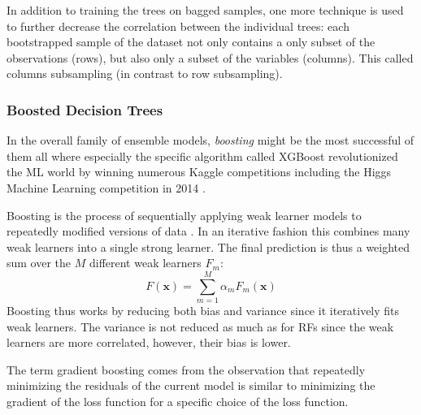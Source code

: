 \documentclass[a4paper, twoside, nobib]{tufte-book}
\newcommand{\autocite}[1]{\citep{#1}}
\renewcommand{\vec}[1]{\mathbf{#1}}
\newcommand{\TODO}{\textcolor{red}{\bf TODO!}\xspace}
\begin{document}
In addition to training the trees on bagged samples, one more technique is used to further decrease the correlation between the individual trees: each bootstrapped sample of the dataset not only contains a only subset of the observations (rows), but also only a subset of the variables (columns). This called columns subsampling (in contrast to row subsampling).


\subsubsection{Boosted Decision Trees}
\label{subsubsec:ml:boosted_decision_trees}
In the overall family of ensemble models, \emph{boosting} might be the most successful of them all where especially the specific algorithm called XGBoost \autocite{chenXGBoostScalableTree2016} revolutionized the ML world by winning numerous Kaggle\sidenote{XXX \TODO} competitions \autocite{DmlcXgboost} including the Higgs Machine Learning competition in \num{2014} \autocite{HEPMeetsML}. 

Boosting is the process of sequentially applying weak learner models to repeatedly modified versions of data \autocite{hastieElementsStatisticalLearning2009}. In an iterative fashion this combines many weak learners into a single strong learner. The final prediction is thus a weighted sum over the $M$ different weak learners $F_m$: 
\begin{equation}
  F(\vec{x}) = \sum_{m=1}^M \alpha_m F_m(\vec{x})
\end{equation}
Boosting thus works by reducing both bias and variance since it iteratively fits weak learners. The variance is not reduced as much as for RFs since the weak learners are more correlated, however, their bias is lower. 

The term gradient boosting comes from the observation that repeatedly minimizing the residuals of the current model is similar to minimizing the gradient of the loss function for a specific choice of the loss function.
\end{document}

